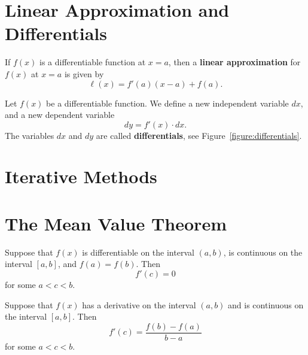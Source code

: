 \documentclass{ximera}
\renewcommand{\l}{\ell}
\begin{document}
\section*{Linear Approximation and Differentials}






\begin{definition}
If $f(x)$ is a differentiable function at $x=a$, then a \textbf{linear
approximation} for $f(x)$ at $x=a$ is given by
\[
\l(x) = f'(a)(x-a) +f(a).
\]
\end{definition}



\begin{definition}  %
Let $f(x)$ be a differentiable function. We define a new
independent variable $dx$, and a new dependent variable
\[
dy=f'(x)\cdot dx.
\]
The variables $dx$ and $dy$ are called \textbf{differentials}, see
Figure~\ref{figure:differentials}.
\end{definition}







\section*{Iterative Methods}








\section*{The Mean Value Theorem}







\begin{theorem}
Suppose that $f(x)$ is differentiable on the interval $(a,b)$, is
continuous on the interval $[a,b]$, and $f(a)=f(b)$. Then
\[
f'(c)=0
\]
for some $a<c<b$.
\label{thm:rolle}
\end{theorem}




\begin{theorem}\label{thm:mvt}
Suppose that $f(x)$ has a derivative on the interval $(a,b)$ and is
continuous on the interval $[a,b]$. Then
\[
f'(c)=\frac{f(b)-f(a)}{b-a}
\]
for some $a<c<b$.
\end{theorem}
\end{document}
